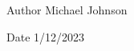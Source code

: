 \begin{DoxyAuthor}{Author}
Michael Johnson 
\end{DoxyAuthor}
\begin{DoxyDate}{Date}
1/12/2023 
\end{DoxyDate}
